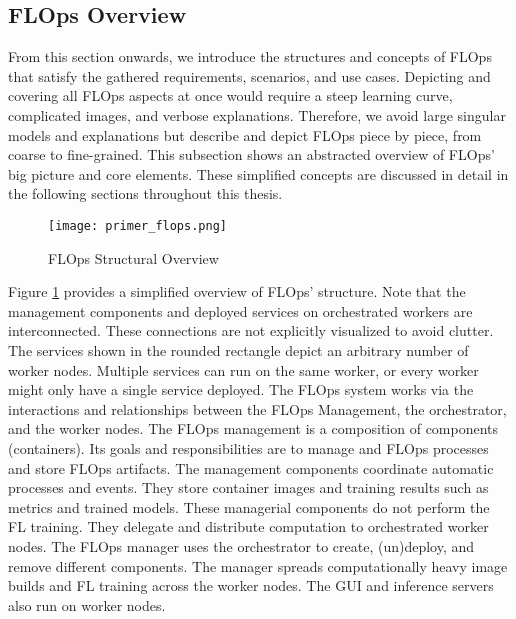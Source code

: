 \subsection{FLOps Overview}

From this section onwards, we introduce the structures and concepts of FLOps that satisfy the gathered requirements, scenarios, and use cases.
Depicting and covering all FLOps aspects at once would require a steep learning curve, complicated images, and verbose explanations.
Therefore, we avoid large singular models and explanations but describe and depict FLOps piece by piece, from coarse to fine-grained.
This subsection shows an abstracted overview of FLOps' big picture and core elements.
These simplified concepts are discussed in detail in the following sections throughout this thesis.

\begin{figure}[H]
    \begin{adjustwidth}{-0.1\paperwidth}{-0.1\paperwidth}
        \centering
        \texttt{[image: primer\_flops.png]}
        \caption{FLOps Structural Overview}
        \label{fig:flops_structure_overview}
    \end{adjustwidth}
\end{figure}

Figure \ref{fig:flops_structure_overview} provides a simplified overview of FLOps' structure.
Note that the management components and deployed services on orchestrated workers are interconnected.
These connections are not explicitly visualized to avoid clutter.
The services shown in the rounded rectangle depict an arbitrary number of worker nodes.
Multiple services can run on the same worker, or every worker might only have a single service deployed.
The FLOps system works via the interactions and relationships between the FLOps Management, the orchestrator, and the worker nodes.
The FLOps management is a composition of components (containers).
Its goals and responsibilities are to manage and FLOps processes and store FLOps artifacts.
The management components coordinate automatic processes and events.
They store container images and training results such as metrics and trained models.
These managerial components do not perform the FL training.
They delegate and distribute computation to orchestrated worker nodes.
The FLOps manager uses the orchestrator to create, (un)deploy, and remove different components.
The manager spreads computationally heavy image builds and FL training across the worker nodes.
The GUI and inference servers also run on worker nodes.

